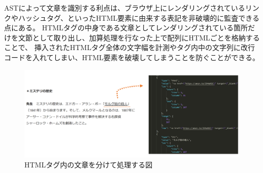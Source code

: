ASTによって文章を識別する利点は、ブラウザ上にレンダリングされているリンクやハッシュタグ、といったHTML要素に由来する表記を非破壊的に監査できる点にある。
HTMLタグの中身である文章としてレンダリングされている箇所だけを文節として取り出し、加算処理を行なった上で配列にHTMLごとを格納することで、
挿入されたHTMLタグ全体の文字幅を計測やタグ内中の文字列に改行コードを入れてしまい、HTML要素を破壊してしまうことを防ぐことができる。
\begin{figure}[H]
    \centering
    \label{fig:image16}
    \includegraphics[width=0.8\columnwidth]{image/03/img7.png}
	\caption[HTMLタグ内の文章を分けて処理する図]{HTMLタグ内の文章を分けて処理する図} \footnotemark[4]
\end{figure}





